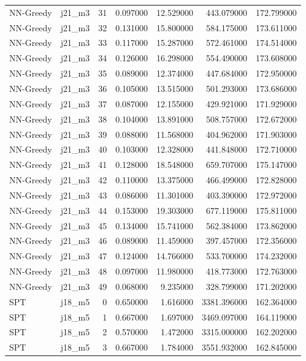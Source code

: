 \begin{tabular}{llrrrrr}
NN-Greedy & j21_m3 & 31 & 0.097000 & 12.529000 & 443.079000 & 172.799000 \\
NN-Greedy & j21_m3 & 32 & 0.131000 & 15.800000 & 584.175000 & 173.611000 \\
NN-Greedy & j21_m3 & 33 & 0.117000 & 15.287000 & 572.461000 & 174.514000 \\
NN-Greedy & j21_m3 & 34 & 0.126000 & 16.298000 & 554.490000 & 173.608000 \\
NN-Greedy & j21_m3 & 35 & 0.089000 & 12.374000 & 447.684000 & 172.950000 \\
NN-Greedy & j21_m3 & 36 & 0.105000 & 13.515000 & 501.293000 & 173.686000 \\
NN-Greedy & j21_m3 & 37 & 0.087000 & 12.155000 & 429.921000 & 171.929000 \\
NN-Greedy & j21_m3 & 38 & 0.104000 & 13.891000 & 508.757000 & 172.672000 \\
NN-Greedy & j21_m3 & 39 & 0.088000 & 11.568000 & 404.962000 & 171.903000 \\
NN-Greedy & j21_m3 & 40 & 0.103000 & 12.328000 & 441.848000 & 172.710000 \\
NN-Greedy & j21_m3 & 41 & 0.128000 & 18.548000 & 659.707000 & 175.147000 \\
NN-Greedy & j21_m3 & 42 & 0.110000 & 13.375000 & 466.499000 & 172.828000 \\
NN-Greedy & j21_m3 & 43 & 0.086000 & 11.301000 & 403.390000 & 172.972000 \\
NN-Greedy & j21_m3 & 44 & 0.153000 & 19.303000 & 677.119000 & 175.811000 \\
NN-Greedy & j21_m3 & 45 & 0.134000 & 15.741000 & 562.384000 & 173.862000 \\
NN-Greedy & j21_m3 & 46 & 0.089000 & 11.459000 & 397.457000 & 172.356000 \\
NN-Greedy & j21_m3 & 47 & 0.124000 & 14.766000 & 533.700000 & 174.232000 \\
NN-Greedy & j21_m3 & 48 & 0.097000 & 11.980000 & 418.773000 & 172.763000 \\
NN-Greedy & j21_m3 & 49 & 0.068000 & 9.235000 & 328.799000 & 171.202000 \\
SPT & j18_m5 & 0 & 0.650000 & 1.616000 & 3381.396000 & 162.364000 \\
SPT & j18_m5 & 1 & 0.667000 & 1.697000 & 3469.097000 & 164.119000 \\
SPT & j18_m5 & 2 & 0.570000 & 1.472000 & 3315.000000 & 162.202000 \\
SPT & j18_m5 & 3 & 0.667000 & 1.784000 & 3551.932000 & 162.845000 \\

\end{tabular}
